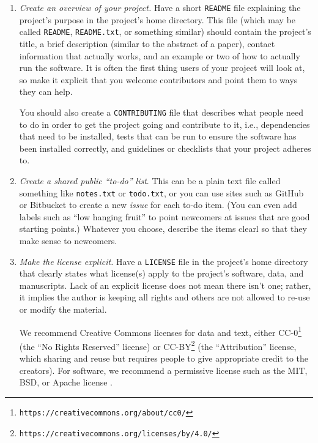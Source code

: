 \documentclass[10pt]{article}
\newcommand{\recommend}[1]{\textit{#1}}
\newcommand{\withurl}[2]{{#1}\footnote{\texttt{#2}}}
\begin{document}
\begin{enumerate}

\item
  \recommend{Create an overview of your project.}  Have a short
  \texttt{README} file explaining the project's purpose in the
  project's home directory.  This file (which may be called
  \texttt{README}, \texttt{README.txt}, or something similar) should
  contain the project's title, a brief description (similar to the
  abstract of a paper), contact information that actually works, and
  an example or two of how to actually run the software.  It is often
  the first thing users of your project will look at, so make it
  explicit that you welcome contributors and point them to ways they
  can help.
  
  You should also create a \texttt{CONTRIBUTING} file that describes
  what people need to do in order to get the project going and
  contribute to it, i.e., dependencies that need to be installed,
  tests that can be run to ensure the software has been installed
  correctly, and guidelines or checklists that your project adheres
  to.

\item
  \recommend{Create a shared public ``to-do'' list}.  This can be a
  plain text file called something like \texttt{notes.txt} or
  \texttt{todo.txt}, or you can use sites such as GitHub or Bitbucket
  to create a new \emph{issue} for each to-do item. (You can even add
  labels such as ``low hanging fruit'' to point newcomers at issues
  that are good starting points.)  Whatever you choose, describe the
  items clearl so that they make sense to newcomers.

\item
  \recommend{Make the license explicit.}  Have a \texttt{LICENSE} file
  in the project's home directory that clearly states what license(s)
  apply to the project's software, data, and manuscripts. Lack of an
  explicit license does not mean there isn't one; rather, it implies
  the author is keeping all rights and others are not allowed to
  re-use or modify the material.

  We recommend Creative Commons licenses for data and text, either
  \withurl{CC-0}{https://creativecommons.org/about/cc0/} (the ``No
  Rights Reserved'' license) or
  \withurl{CC-BY}{https://creativecommons.org/licenses/by/4.0/} (the
  ``Attribution'' license, which sharing and reuse but requires people
  to give appropriate credit to the creators).  For software, we
  recommend a permissive license such as the MIT, BSD, or Apache
  license \cite{laurent2004}.


\end{enumerate}
\end{document}
